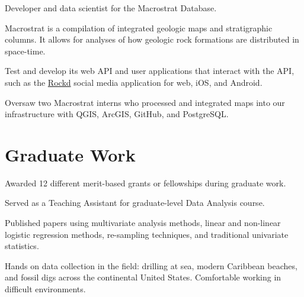 \documentclass[]{deedy-resume-openfont}
\begin{document}
\begin{minipage}[t]{0.66\textwidth}
\begin{tightemize}
\item Developer and data scientist for the Macrostrat Database. 
\item Macrostrat is a compilation of integrated geologic maps and stratigraphic columns. It allows for analyses of how geologic rock formations are distributed in space-time.
\item Test and develop its web API and user applications that interact with the API, such as the \href{https://rockd.org}{Rockd} social media application for web, iOS, and Android.
\item Oversaw two Macrostrat interns who processed and integrated maps into our infrastructure with QGIS, ArcGIS, GitHub, and PostgreSQL.
\end{tightemize}
\sectionsep

\section{Graduate Work}

\begin{tightemize}
\item Awarded 12 different merit-based grants or fellowships during graduate work.
\item Served as a Teaching Assistant for graduate-level Data Analysis course.
\item Published papers using multivariate analysis methods, linear and non-linear logistic regression methods, re-sampling techniques, and traditional univariate statistics.
\item Hands on data collection in the field: drilling at sea, modern Caribbean beaches, and fossil digs across the continental United States. Comfortable working in difficult environments.
\end{tightemize}
\sectionsep




\end{minipage}
\end{document}
